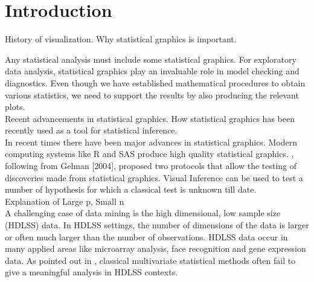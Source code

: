 \documentclass[12]{article}
\begin{document}
\section{Introduction} 

{\color{red} History of visualization. Why statistical graphics is important.}

Any statistical analysis must include some statistical graphics. For exploratory data analysis, statistical graphics play an invaluable role in model checking and diagnostics. Even though we have established mathematical procedures to obtain various statistics, we need to support the results by also producing the relevant plots. \\
{\color{red} Recent advancements in statistical graphics. How statistical graphics has been recently used as a tool for statistical inference.}\\
In recent times there have been major advances in statistical graphics. Modern computing systems like R and SAS produce high quality statistical graphics. \cite{buja:2009}, following from Gelman [2004], proposed two protocols that allow the testing of discoveries made from statistical graphics. Visual Inference can be used to test a number of hypothesis for which a classical test is unknown till date.\\
{\color{red} Explanation of Large p, Small n}\\
A challenging case of data mining is the high dimensional, low sample size (HDLSS) data. In HDLSS  settings, the number of dimensions of the data is larger or often much larger than the number of observations. HDLSS data occur in many applied areas like microarray analysis, face recognition and gene expression data. As pointed out in \cite{marron:2007}, classical multivariate statistical methods often fail to give a meaningful analysis in HDLSS contexts. 
\end{document}
